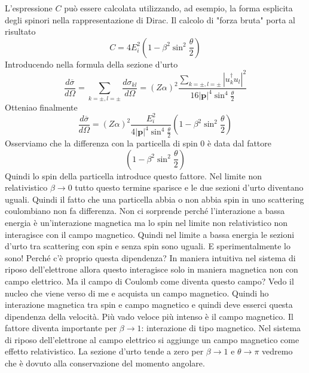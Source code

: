 L'espressione $C$ può essere calcolata utilizzando, ad esempio, la forma esplicita degli spinori nella rappresentazione di Dirac. Il calcolo di "forza bruta" porta al risultato
$$
C = 4E_i^2 \left( 1 - \beta^2 \sin^2 \frac{\theta}{2} \right)
$$
Introducendo nella formula della sezione d'urto
$$
\frac{d\overline{\sigma}}{d\Omega} = \sum_{k=\pm, l=\pm} \frac{d\sigma_{kl}}{d\Omega} = (Z\alpha)^2 \frac{\sum_{k=\pm, l=\pm} |u_k^\dagger u_l|^2}{16 |\mathbf{p}|^4 \sin^4 \frac{\theta}{2}}
$$
Otteniao finalmente
$$
\frac{d\overline{\sigma}}{d\Omega} = (Z\alpha)^2 \frac{E_i^2}{4|\mathbf{p}|^4 \sin^4 \frac{\theta}{2}} \left( 1 - \beta^2 \sin^2 \frac{\theta}{2} \right)
$$
Osserviamo che la differenza con la particella di spin 0 è data dal fattore 
$$
\left( 1 - \beta^2 \sin^2 \frac{\theta}{2} \right)
$$
Quindi lo spin della particella introduce questo fattore. Nel limite non relativistico $\beta\to 0$ tutto questo termine sparisce e le due sezioni d'urto diventano uguali. Quindi il fatto che una particella abbia o non abbia spin in uno scattering coulombiano non fa differenza. Non ci sorprende perché l'interazione a bassa energia è un'interazione magnetica ma lo spin nel limite non relativistico non interagisce con il campo magnetico. Quindi nel limite a bassa energia le sezioni d'urto tra  scattering con spin e senza spin sono uguali. E sperimentalmente lo sono!
Perché c'è proprio questa dipendenza? In maniera intuitiva nel sistema di riposo dell'elettrone allora questo interagisce solo in maniera magnetica non con campo elettrico. Ma il campo di Coulomb come diventa questo campo? Vedo il nucleo che viene verso di me e acquista un campo magnetico. Quindi ho interazione magnetica tra spin e campo magnetico e quindi deve esserci questa dipendenza della velocità. Più vado veloce più intenso è il campo magnetico.
Il fattore diventa importante per $\beta\to1$: interazione di tipo magnetico. Nel sistema di riposo dell'elettrone al campo elettrico si aggiunge un campo magnetico come effetto relativistico. La sezione d'urto tende a zero per $\beta\to1$ e $\theta\to\pi$ vedremo che è dovuto alla conservazione del momento angolare.